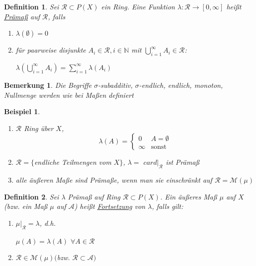 \documentclass[11pt]{memoir}
\theoremstyle{changebreak}
\newtheorem{Definition}{Definition}[chapter]
\newtheorem{Bemerkung}{Bemerkung}[chapter]
\newtheorem{Beispiel}{Beispiel}[chapter]
\begin{document}
\begin{Definition}
Sei $\mathscr R \subset P(X)$ ein Ring. Eine Funktion $\lambda: \mathscr R \rightarrow [0, \infty]$ heißt \underline{Prämaß} auf $\mathscr R$, falls
\begin{enumerate}
	\item $\lambda(\emptyset) = 0$
	\item für paarweise disjunkte $A_i \in \mathscr R, i \in \mathbb N$ mit $\bigcup\limits_{i=1}^\infty A_i \in \mathscr R$: 
	\begin{center}
		$\lambda \left(\bigcup\limits_{i=1}^\infty A_i\right) = \sum\limits_{i=1}^\infty \lambda(A_i)$
	\end{center}
\end{enumerate}
\end{Definition}

\begin{Bemerkung}
Die Begriffe $\sigma$-subadditiv, $\sigma$-endlich, endlich, monoton, Nullmenge werden wie bei Maßen definiert
\end{Bemerkung}

\begin{Beispiel}
\begin{enumerate}
	\item $\mathscr R$ Ring über $X$,
	\begin{equation}
	\lambda(A) =
		\begin{cases}
			0 & A = \emptyset \\
			\infty & \text{sonst}
		\end{cases}
	\end{equation}
	\item $\mathscr R = \{$endliche Teilmengen vom $X\}$, $\lambda = $ $card|_{\mathscr R}$ ist Prämaß
	\item alle äußeren Maße sind Prämaße, wenn man sie einschränkt auf $\mathscr R = \mathscr M(\mu)$
\end{enumerate}
\end{Beispiel}

\begin{Definition}
Sei $\lambda$ Prämaß auf Ring $\mathscr R \subset P(X)$. Ein äußeres Maß $\mu$ auf $X$ (bzw. ein Maß $\mu$ auf $\mathscr A$) heißt \underline{Fortsetzung} von $\lambda$, falls gilt:
\begin{enumerate}
	\item $\mu|_\mathscr R = \lambda$, d.h. 
	\begin{center}
		$\mu(A) = \lambda(A)$ $\forall A \in \mathscr R$
	\end{center}
	\item $\mathscr R \in \mathscr M(\mu) ($bzw. $\mathscr R \subset \mathscr A)$
\end{enumerate}
\end{Definition}
\end{document}
